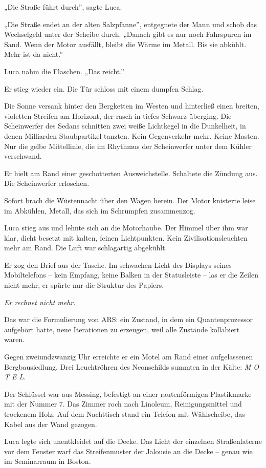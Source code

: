 \documentclass[
  ngerman,
]{article}
\begin{document}
„Die Straße führt durch'', sagte Luca.

„Die Straße endet an der alten Salzpfanne'', entgegnete der Mann und
schob das Wechselgeld unter der Scheibe durch. „Danach gibt es nur noch
Fahrspuren im Sand. Wenn der Motor ausfällt, bleibt die Wärme im Metall.
Bis sie abkühlt. Mehr ist da nicht.''

Luca nahm die Flaschen. „Das reicht.''

Er stieg wieder ein. Die Tür schloss mit einem dumpfen Schlag.

Die Sonne versank hinter den Bergketten im Westen und hinterließ einen
breiten, violetten Streifen am Horizont, der rasch in tiefes Schwarz
überging. Die Scheinwerfer des Sedans schnitten zwei weiße Lichtkegel in
die Dunkelheit, in denen Milliarden Staubpartikel tanzten. Kein
Gegenverkehr mehr. Keine Masten. Nur die gelbe Mittellinie, die im
Rhythmus der Scheinwerfer unter dem Kühler verschwand.

Er hielt am Rand einer geschotterten Ausweichstelle. Schaltete die
Zündung aus. Die Scheinwerfer erloschen.

Sofort brach die Wüstennacht über den Wagen herein. Der Motor knisterte
leise im Abkühlen, Metall, das sich im Schrumpfen zusammenzog.

Luca stieg aus und lehnte sich an die Motorhaube. Der Himmel über ihm
war klar, dicht besetzt mit kalten, feinen Lichtpunkten. Kein
Zivilisationsleuchten mehr am Rand. Die Luft war schlagartig abgekühlt.

Er zog den Brief aus der Tasche. Im schwachen Licht des Displays seines
Mobiltelefons -- kein Empfang, keine Balken in der Statusleiste -- las
er die Zeilen nicht mehr, er spürte nur die Struktur des Papiers.

\emph{Er rechnet nicht mehr.}

Das war die Formulierung von ARS: ein Zustand, in dem ein
Quantenprozessor aufgehört hatte, neue Iterationen zu erzeugen, weil
alle Zustände kollabiert waren.

Gegen zweiundzwanzig Uhr erreichte er ein Motel am Rand einer
aufgelassenen Bergbausiedlung. Drei Leuchtröhren des Neonschilds summten
in der Kälte: \emph{M O T E L}.

Der Schlüssel war aus Messing, befestigt an einer rautenförmigen
Plastikmarke mit der Nummer 7. Das Zimmer roch nach Linoleum,
Reinigungsmittel und trockenem Holz. Auf dem Nachttisch stand ein
Telefon mit Wählscheibe, das Kabel aus der Wand gezogen.

Luca legte sich unentkleidet auf die Decke. Das Licht der einzelnen
Straßenlaterne vor dem Fenster warf das Streifenmuster der Jalousie an
die Decke -- genau wie im Seminarraum in Boston.
\end{document}
